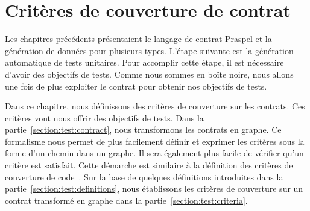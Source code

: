 \chapter{Critères de couverture de contrat}
\label{chapter:tests}

\mminitoc

Les chapitres précédents présentaient le langage de contrat Praspel et la
génération de données pour plusieurs types. L'étape suivante est la génération
automatique de tests unitaires. Pour accomplir cette étape, il est nécessaire
d'avoir des objectifs de tests. Comme nous sommes en boîte noire, nous allons
une fois de plus exploiter le contrat pour obtenir nos objectifs de tests.

Dans ce chapitre, nous définissons des critères de couverture sur les contrats.
Ces critères vont nous offrir des objectifs de tests. Dans la
partie~\ref{section:test:contract}, nous transformons les contrats en graphe. Ce
formalisme nous permet de plus facilement définir et exprimer les critères sous
la forme d'un chemin dans un graphe. Il sera également plus facile de vérifier
qu'un critère est satisfait. Cette démarche est similaire à la définition des
critères de couverture de code~. Sur la base de quelques
définitions introduites dans la partie~\ref{section:test:definitions}, nous
établissons les critères de couverture sur un contrat transformé en graphe dans
la partie~\ref{section:test:criteria}.

